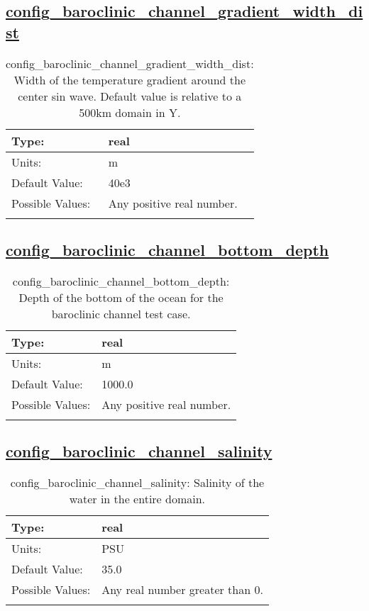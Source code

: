 \subsection[config\_baroclinic\_channel\_gradient\_width\_dist]{\hyperref[sec:nm_tab_baroclinic_channel]{config\_baroclinic\_channel\_gradient\_width\_dist}}
\label{subsec:nm_sec_config_baroclinic_channel_gradient_width_dist}
\begin{center}
\begin{longtable}{| p{2.0in} || p{4.0in} |}
    \hline
    Type: & real \\
    \hline
    Units: & \si{m} \\
    \hline
    Default Value: & 40e3 \\
    \hline
    Possible Values: & Any positive real number. \\
    \hline
    \caption{config\_baroclinic\_channel\_gradient\_width\_dist: Width of the temperature gradient around the center sin wave. Default value is relative to a 500km domain in Y.}
\end{longtable}
\end{center}
\subsection[config\_baroclinic\_channel\_bottom\_depth]{\hyperref[sec:nm_tab_baroclinic_channel]{config\_baroclinic\_channel\_bottom\_depth}}
\label{subsec:nm_sec_config_baroclinic_channel_bottom_depth}
\begin{center}
\begin{longtable}{| p{2.0in} || p{4.0in} |}
    \hline
    Type: & real \\
    \hline
    Units: & \si{m} \\
    \hline
    Default Value: & 1000.0 \\
    \hline
    Possible Values: & Any positive real number. \\
    \hline
    \caption{config\_baroclinic\_channel\_bottom\_depth: Depth of the bottom of the ocean for the baroclinic channel test case.}
\end{longtable}
\end{center}
\subsection[config\_baroclinic\_channel\_salinity]{\hyperref[sec:nm_tab_baroclinic_channel]{config\_baroclinic\_channel\_salinity}}
\label{subsec:nm_sec_config_baroclinic_channel_salinity}
\begin{center}
\begin{longtable}{| p{2.0in} || p{4.0in} |}
    \hline
    Type: & real \\
    \hline
    Units: & \si{PSU} \\
    \hline
    Default Value: & 35.0 \\
    \hline
    Possible Values: & Any real number greater than 0. \\
    \hline
    \caption{config\_baroclinic\_channel\_salinity: Salinity of the water in the entire domain.}
\end{longtable}
\end{center}
